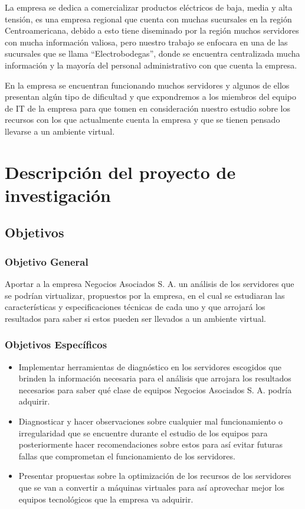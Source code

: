 La empresa se dedica a comercializar productos eléctricos de baja, media y alta tensión, es una empresa regional que cuenta con muchas sucursales en la región Centroamericana, debido a esto tiene diseminado por la región muchos servidores con mucha información valiosa, pero nuestro trabajo se enfocara en una de las sucursales que se llama “Electrobodegas”, donde se encuentra centralizada mucha información y la mayoría del personal administrativo con que cuenta la empresa.

En la empresa se encuentran funcionando muchos servidores y algunos de ellos presentan algún tipo de dificultad y que expondremos a los miembros del equipo de IT de la empresa para que tomen en consideración nuestro estudio sobre los recursos con los que actualmente cuenta la empresa y que se tienen pensado llevarse a un ambiente virtual.

\chapter{Descripción del proyecto de investigación}

\section{Objetivos}

\subsection{Objetivo General}

Aportar a la empresa Negocios Asociados S. A. un análisis de los servidores que se podrían virtualizar, propuestos por la empresa, en el cual se estudiaran las características y especificaciones técnicas de cada uno y que arrojará los resultados para saber si estos pueden ser llevados a un ambiente virtual.


\subsection{Objetivos Específicos}

\begin{itemize}
\item Implementar herramientas de diagnóstico en los servidores escogidos que brinden la información necesaria para el análisis que arrojara los resultados necesarios para saber qué clase de equipos Negocios Asociados S. A. podría adquirir.

\item Diagnosticar y hacer observaciones sobre cualquier mal funcionamiento o irregularidad  que se encuentre durante el estudio de los equipos para posteriormente hacer recomendaciones sobre estos para así evitar futuras fallas que comprometan el funcionamiento de los servidores.

\item Presentar propuestas sobre la optimización de los recursos de los servidores que se van a convertir a máquinas virtuales para así aprovechar mejor los equipos tecnológicos que la empresa va adquirir.
\end{itemize}

